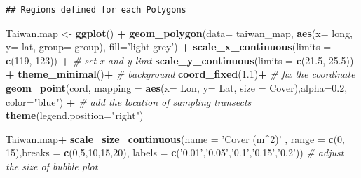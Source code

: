 \documentclass[
]{article}
\newenvironment{Shaded}{\begin{snugshade}}{\end{snugshade}}
\newcommand{\CommentTok}[1]{\textcolor[rgb]{0.56,0.35,0.01}{\textit{#1}}}
\newcommand{\DataTypeTok}[1]{\textcolor[rgb]{0.13,0.29,0.53}{#1}}
\newcommand{\DecValTok}[1]{\textcolor[rgb]{0.00,0.00,0.81}{#1}}
\newcommand{\FloatTok}[1]{\textcolor[rgb]{0.00,0.00,0.81}{#1}}
\newcommand{\KeywordTok}[1]{\textcolor[rgb]{0.13,0.29,0.53}{\textbf{#1}}}
\newcommand{\NormalTok}[1]{#1}
\newcommand{\OperatorTok}[1]{\textcolor[rgb]{0.81,0.36,0.00}{\textbf{#1}}}
\newcommand{\StringTok}[1]{\textcolor[rgb]{0.31,0.60,0.02}{#1}}
\begin{document}
\begin{verbatim}
## Regions defined for each Polygons
\end{verbatim}

\begin{Shaded}
\begin{Highlighting}[]
\NormalTok{Taiwan.map <-}\StringTok{ }\KeywordTok{ggplot}\NormalTok{() }\OperatorTok{+}
\StringTok{  }\KeywordTok{geom_polygon}\NormalTok{(}\DataTypeTok{data=}\NormalTok{ taiwan_map, }\KeywordTok{aes}\NormalTok{(}\DataTypeTok{x=}\NormalTok{ long, }\DataTypeTok{y=}\NormalTok{ lat, }\DataTypeTok{group=}\NormalTok{ group), }\DataTypeTok{fill=}\StringTok{'light grey'}\NormalTok{) }\OperatorTok{+}
\StringTok{  }\KeywordTok{scale_x_continuous}\NormalTok{(}\DataTypeTok{limits =} \KeywordTok{c}\NormalTok{(}\DecValTok{119}\NormalTok{, }\DecValTok{123}\NormalTok{)) }\OperatorTok{+}\StringTok{ }\CommentTok{# set x and y limt}
\StringTok{  }\KeywordTok{scale_y_continuous}\NormalTok{(}\DataTypeTok{limits =} \KeywordTok{c}\NormalTok{(}\FloatTok{21.5}\NormalTok{, }\FloatTok{25.5}\NormalTok{)) }\OperatorTok{+}
\StringTok{  }\KeywordTok{theme_minimal}\NormalTok{()}\OperatorTok{+}\StringTok{  }\CommentTok{# background    }
\StringTok{  }\KeywordTok{coord_fixed}\NormalTok{(}\FloatTok{1.1}\NormalTok{)}\OperatorTok{+}\StringTok{ }\CommentTok{# fix the coordinate}
\StringTok{  }\KeywordTok{geom_point}\NormalTok{(cord, }\DataTypeTok{mapping =} \KeywordTok{aes}\NormalTok{(}\DataTypeTok{x=}\NormalTok{ Lon, }\DataTypeTok{y=}\NormalTok{ Lat, }\DataTypeTok{size =}\NormalTok{ Cover),}\DataTypeTok{alpha=}\FloatTok{0.2}\NormalTok{, }\DataTypeTok{color=}\StringTok{"blue"}\NormalTok{) }\OperatorTok{+}\StringTok{ }\CommentTok{# add the location of sampling transects}
\StringTok{  }\KeywordTok{theme}\NormalTok{(}\DataTypeTok{legend.position=}\StringTok{"right"}\NormalTok{)}

\NormalTok{Taiwan.map}\OperatorTok{+}\StringTok{ }\KeywordTok{scale_size_continuous}\NormalTok{(}\DataTypeTok{name =} \StringTok{'Cover (m^2)'}\NormalTok{ , }\DataTypeTok{range =} \KeywordTok{c}\NormalTok{(}\DecValTok{0}\NormalTok{, }\DecValTok{15}\NormalTok{),}\DataTypeTok{breaks =} \KeywordTok{c}\NormalTok{(}\DecValTok{0}\NormalTok{,}\DecValTok{5}\NormalTok{,}\DecValTok{10}\NormalTok{,}\DecValTok{15}\NormalTok{,}\DecValTok{20}\NormalTok{), }\DataTypeTok{labels =} \KeywordTok{c}\NormalTok{(}\StringTok{'0.01'}\NormalTok{,}\StringTok{'0.05'}\NormalTok{,}\StringTok{'0.1'}\NormalTok{,}\StringTok{'0.15'}\NormalTok{,}\StringTok{'0.2'}\NormalTok{)) }\CommentTok{# adjust the size of bubble plot}
\end{Highlighting}
\end{Shaded}
\end{document}
